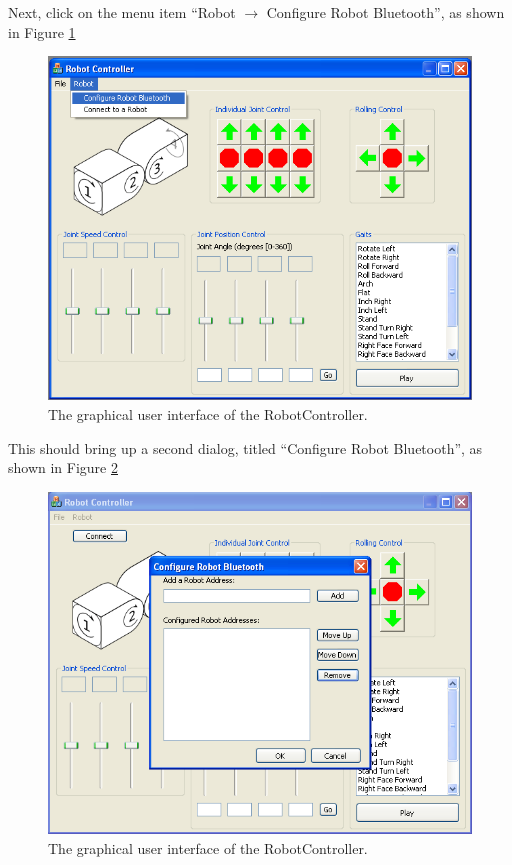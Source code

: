 \documentclass{article}
\begin{document}
Next, click on the menu item ``Robot $\rightarrow$ Configure Robot Bluetooth'', as
shown in Figure \ref{fig:shot3.png}

\begin{figure}[H]
\begin{center}
\includegraphics[width=4.5in]{images/shot3.png}
\end{center}
\caption{\label{fig:shot3.png} The graphical user interface of the RobotController.}
\end{figure}

This should bring up a second dialog, titled ``Configure Robot Bluetooth'', as
shown in Figure \ref{fig:shot4.png}

\begin{figure}[H]
\begin{center}
\includegraphics[width=4.5in]{images/shot4.png}
\end{center}
\caption{\label{fig:shot4.png} The graphical user interface of the RobotController.}
\end{figure}
\end{document}
